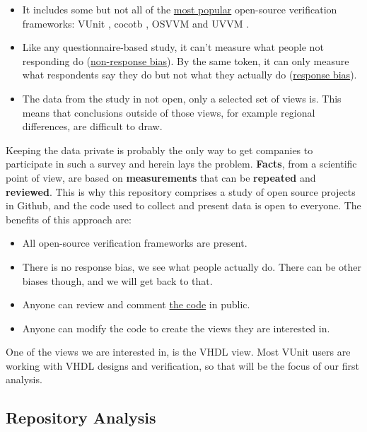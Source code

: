 \documentclass[]{article}
\providecommand{\tightlist}{%
  \setlength{\itemsep}{0pt}\setlength{\parskip}{0pt}}
\begin{document}
\begin{itemize}
\tightlist
\item
  It includes some but not all of the \href{https://star-history.t9t.io/\#vunit/vunit\&osvvm/osvvm\&cocotb/cocotb\&UVVM/UVVM}{most popular} open-source verification frameworks: VUnit \autocite{vunit}, cocotb \autocite{cocotb}, OSVVM \autocite{osvvm} and UVVM \autocite{uvvm}.
\item
  Like any questionnaire-based study, it can't measure what people not responding do (\href{https://en.wikipedia.org/wiki/Participation_bias}{non-response bias}). By the same token, it can only measure what respondents say they do but not what they actually do (\href{https://en.wikipedia.org/wiki/Response_bias}{response bias}).
\item
  The data from the study in not open, only a selected set of views is. This means that conclusions outside of those views, for example regional differences, are difficult to draw.
\end{itemize}

Keeping the data private is probably the only way to get companies to participate in such a survey and herein lays the problem. \textbf{Facts}, from a scientific point of view, are based on \textbf{measurements} that can be \textbf{repeated} and \textbf{reviewed}. This is why this repository comprises a study of open source projects in Github, and the code used to collect and present data is open to everyone. The benefits of this approach are:

\begin{itemize}
\tightlist
\item
  All open-source verification frameworks are present.
\item
  There is no response bias, we see what people actually do. There can be other biases though, and we will get back to that.
\item
  Anyone can review and comment \href{https://github.com/LarsAsplund/github-facts/tree/main/py}{the code} in public.
\item
  Anyone can modify the code to create the views they are interested in.
\end{itemize}

One of the views we are interested in, is the VHDL view. Most VUnit users are working with VHDL designs and verification, so that will be the focus of our first analysis.

\hypertarget{repository-analysis}{%
\subsection{Repository Analysis}\label{repository-analysis}}
\end{document}
